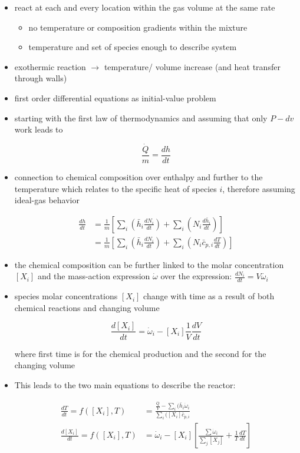 \documentclass[12pt,oneside,a4paper,english]{article}
\begin{document}
\begin{itemize}
\item {react at each and every location within the gas volume at the same rate}

	\begin{itemize}
	\item {no temperature or composition gradients within the mixture}
	\item {temperature and set of species enough to describe system}
	\end{itemize}

\item {exothermic reaction $\rightarrow$ temperature/ volume increase (and heat transfer through walls)}
\item {first order differential equations as initial-value problem}
\item {starting with the first law of thermodynamics and assuming that only $P-dv$ work leads to}

\begin{equation}
\frac{\dot{Q}}{m}=\frac{dh}{dt}
\end{equation}

\item{connection to chemical composition over enthalpy and further to the temperature which relates to the specific heat of species $i$, therefore assuming ideal-gas behavior}

\begin{align}
\frac{dh}{dt} &= \frac{1}{m}\left[ \sum_i (\bar{h}_i \frac{dN_i}{dt}) + \sum_i (N_i \frac{d \bar{h}_i }{dt}) \right] \\
 &= \frac{1}{m}\left[ \sum_i (\bar{h}_i \frac{dN_i}{dt}) + \sum_i (N_i \bar{c}_{p,i} \frac{dT}{dt}) \right] 
 \end{align}
 
 \item{the chemical composition can be further linked to the molar concentration $[X_i]$ and the mass-action expression $\dot{\omega}$ over the expression: $\frac{dN_i}{dt}=V \dot{\omega_i}$}
 \item {species molar concentrations $[X_i]$ change with time as a result of both chemical reactions and changing volume
 
 \begin{equation}
 \frac{d[X_i]}{dt}=\dot{\omega}_i - [X_i] \frac{1}{V} \frac{dV}{dt}
 \end{equation}
 
 where first time is for the chemical production and the second for the changing volume}
 \item{This leads to the two main equations to describe the reactor:}
 
 \begin{align}
 \frac{dT}{dt}=f([X_i],T) &= \frac{\frac{\dot{Q}}{V}-\sum_i (\bar{h}_i \dot{\omega}_i}{\sum_i ([X_i] \bar{c}_{p,i}} \\
 \frac{d[X_i]}{dt}=f([X_i],T) &= \dot{\omega}_i - [X_i] \left[ \frac{\sum \dot{\omega}_i}{\sum_j [X_j]} + \frac{1}{T} \frac{dT}{dt} \right]
 \end{align}
 
\end{itemize}
\end{document}
